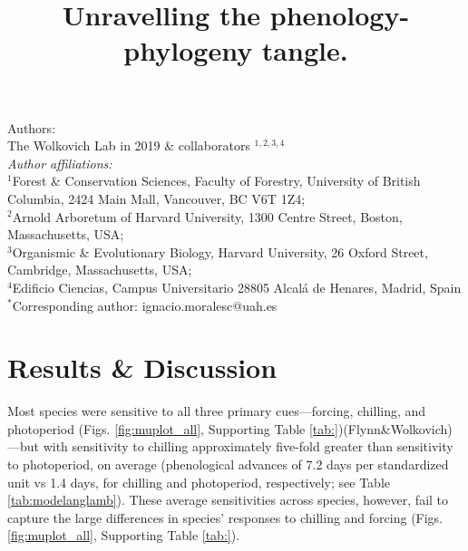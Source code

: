 \documentclass{article}\usepackage[]{graphicx}\usepackage[]{color}
\title{Unravelling the phenology-phylogeny tangle.}
\begin{document}
\maketitle

\noindent Authors:\\
The Wolkovich Lab in 2019 \& collaborators $^{1,2,3,4}$ %
\vspace{2ex}\\
\emph{Author affiliations:}\\
$^{1}$Forest \& Conservation Sciences, Faculty of Forestry, University of British Columbia, 2424 Main Mall, Vancouver, BC V6T 1Z4;\\
$^{2}$Arnold Arboretum of Harvard University, 1300 Centre Street, Boston, Massachusetts, USA;\\
$^{3}$Organismic \& Evolutionary Biology, Harvard University, 26 Oxford Street, Cambridge, Massachusetts, USA;\\
$^{4}$Edificio Ciencias, Campus Universitario 28805 Alcalá de Henares, Madrid, Spain\\
 

\vspace{2ex}
$^*$Corresponding author: ignacio.moralesc@uah.es\\
\renewcommand{\thetable}{\arabic{table}}
\renewcommand{\thefigure}{\arabic{figure}}
\renewcommand{\labelitemi}{$-$}

\clearpage







\section*{Results \& Discussion}

Most species were sensitive to all three primary cues---forcing, chilling, and photoperiod (Figs. \ref{fig:muplot_all}, Supporting Table \ref{tab:})\citep[see also][]{Laube:2014,aettinger2020}(Flynn&Wolkovich)---but with sensitivity to chilling approximately five-fold greater than sensitivity to photoperiod, on average (phenological advances of 7.2 days per standardized unit vs 1.4 days, for chilling and photoperiod, respectively; see Table \ref{tab:modelanglamb}). These average sensitivities across species, however, fail to capture the large differences in species' responses to chilling and forcing (Figs. \ref{fig:muplot_all}, Supporting Table \ref{tab:}). 
\end{document}
